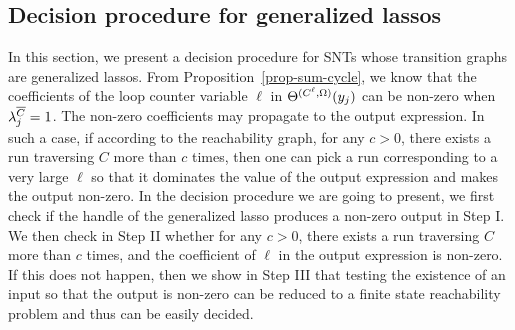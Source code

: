 %
%
%
%

\vspace{-0.5cm}
\subsection{Decision procedure for generalized lassos}\label{sec-glasso}
\vspace{-1mm}
%
In this section, we present a decision procedure for SNTs whose transition graphs are generalized lassos. From Proposition~\ref{prop-sum-cycle}, we know that the coefficients of the loop counter variable $\ell$ in $\Theta^{(C^\ell,\Omega)}(y_j)$ can be non-zero when $\lambda^{\overline{C}}_{j}=1$. The non-zero coefficients may propagate to the output expression.  In such a case, 
if according to the reachability graph, for any $c>0$, there exists a run traversing $C$ more than $c$ times, then one can pick a run corresponding to a very large $\ell$ so that it dominates the value of the output expression and makes the output non-zero. 
In the decision procedure we are going to present, we first check if the handle of the generalized lasso produces a non-zero output in Step I.
We then check in Step II whether for any $c>0$, there exists a run traversing $C$ more than $c$ times, and the coefficient of $\ell$ in the output expression is non-zero. If this does not happen, then we show in Step III that testing the existence of an input so that the output is non-zero can be reduced to a finite state reachability problem and thus can be easily decided.

